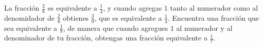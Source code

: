 La fracción $\frac 28$ es equivalente a $\frac 14$, y cuando agregas $1$ tanto al numerador como al denomidador de $\frac 28$ obtienes $\frac 39$, que es equivalente a $\frac 13$. Encuentra una fracción que sea equivalente a $\frac 18$, de manera que cuando agregues $1$ al numerador y al denominador de tu fracción, obtengas una fracción equivalente a $\frac 17$.